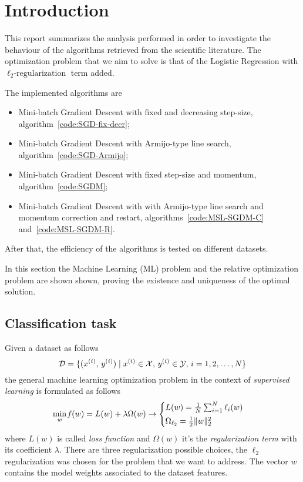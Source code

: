 \section{Introduction}\label{sc:intro}


This report summarizes the analysis performed in order to investigate the behaviour of the algorithms retrieved from the scientific literature. The optimization problem that we aim to solve is that of the Logistic Regression with $\ell_2\text{-regularization}$ term added.

The implemented algorithms are
\begin{itemize}
\item Mini-batch Gradient Descent with fixed and decreasing step-size, algorithm~\vref{code:SGD-fix-decr};
\item Mini-batch Gradient Descent with Armijo-type line search, algorithm~\vref{code:SGD-Armijo};
\item Mini-batch Gradient Descent with fixed step-size and momentum, algorithm~\vref{code:SGDM};
\item Mini-batch Gradient Descent with with Armijo-type line search and momentum correction and restart, algorithms~\ref{code:MSL-SGDM-C} and~\vref{code:MSL-SGDM-R}.
\end{itemize}

After that, the efficiency of the algorithms is tested on different datasets.

In this section the Machine Learning (ML) problem and the relative optimization problem are shown shown, proving the existence and uniqueness of the optimal solution.

\subsection{Classification task}

Given a dataset as follows
\[
\mathcal{D}=\{(x^{(i)},\,y^{(i)})\mid x^{(i)}\in\mathcal{X},\,y^{(i)}\in\mathcal{Y},\,i=1,2,\dots,N\}
\]
the general machine learning optimization problem in the context of \emph{supervised learning} is formulated as follows
\[
\min_{w}\operatorname*{\mathit{f}}(w)=L(w)+\lambda\Omega(w)\rightarrow
\begin{cases}
L(w)=\frac{1}{N}\sum_{i=1}^N\ell_i(w) \\[0.5ex]
\Omega_{\ell_2}=\frac{1}{2}\lVert w\rVert_2^2
\end{cases}
\]
where $L(w)$ is called \emph{loss function} and $\Omega(w)$ it's the \emph{regularization term} with its coefficient $\lambda$. There are three regularization possible choices, the $\ell_2$ regularization was chosen for the problem that we want to address. The vector $w$ contains the model weights associated to the dataset features.

